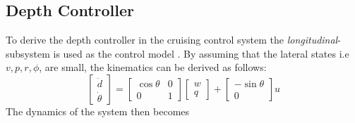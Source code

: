 	\subsection{Depth Controller}
		To derive the depth controller in the cruising control system the
		\textit{longitudinal}-subsystem is used as the control model \cite{fossen}. By assuming that the lateral
		states i.e $v, p, r, \phi$, are small, the kinematics can be derived as follows:
		\begin{equation}
			\left [ \begin{matrix}
					\dot{d} \\
					\dot{\theta}
				\end{matrix} \right] = \left [ \begin{matrix}
								\cos{\theta} & 0 \\
								0 & 1
								\end{matrix} \right] 
						\left[ \begin{matrix}
								w \\
								q
							\end{matrix} \right]
						+ \left [ \begin{matrix}
								-\sin{\theta}\\
								0
							\end{matrix} \right] u
		\end{equation}
		The dynamics of the system then becomes
